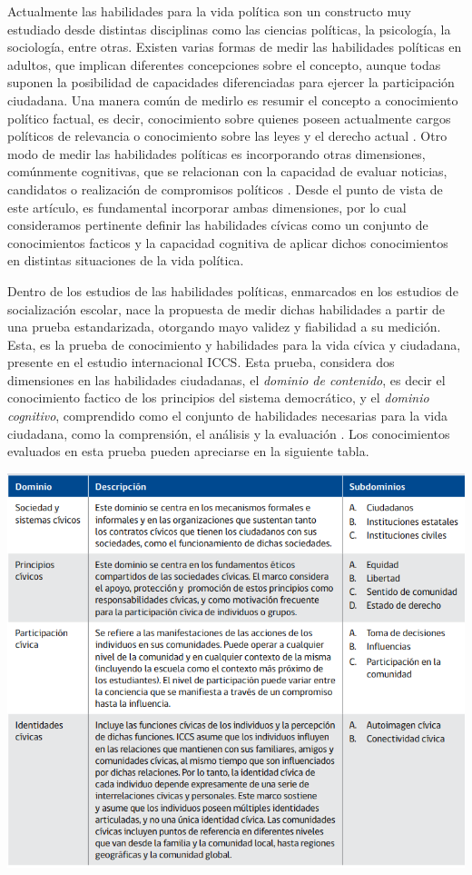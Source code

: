 \documentclass[12pt,twoside]{templates/facsothesis}
\begin{document}
Actualmente las habilidades para la vida política son un constructo muy estudiado desde distintas disciplinas como las ciencias políticas, la psicología, la sociología, entre otras. Existen varias formas de medir las habilidades políticas en adultos, que implican diferentes concepciones sobre el concepto, aunque todas suponen la posibilidad de capacidades diferenciadas para ejercer la participación ciudadana. Una manera común de medirlo es resumir el concepto a conocimiento político factual, es decir, conocimiento sobre quienes poseen actualmente cargos políticos de relevancia o conocimiento sobre las leyes y el derecho actual \citep{petricevic_Why_2020, vanerkel_Why_2020}. Otro modo de medir las habilidades políticas es incorporando otras dimensiones, comúnmente cognitivas, que se relacionan con la capacidad de evaluar noticias, candidatos o realización de compromisos políticos \citep{mondak_Citizen_2020, duval_Citizens_2018}. Desde el punto de vista de este artículo, es fundamental incorporar ambas dimensiones, por lo cual consideramos pertinente definir las habilidades cívicas como un conjunto de conocimientos facticos y la capacidad cognitiva de aplicar dichos conocimientos en distintas situaciones de la vida política.

Dentro de los estudios de las habilidades políticas, enmarcados en los estudios de socialización escolar, nace la propuesta de medir dichas habilidades a partir de una prueba estandarizada, otorgando mayo validez y fiabilidad a su medición. Esta, es la prueba de conocimiento y habilidades para la vida cívica y ciudadana, presente en el estudio internacional ICCS. Esta prueba, considera dos dimensiones en las habilidades ciudadanas, el \emph{dominio de contenido}, es decir el conocimiento factico de los principios del sistema democrático, y el \emph{dominio cognitivo}, comprendido como el conjunto de habilidades necesarias para la vida ciudadana, como la comprensión, el análisis y la evaluación \citep{schulz_Estudio_2011}. Los conocimientos evaluados en esta prueba pueden apreciarse en la siguiente tabla.

\begin{center}\includegraphics[width=0.8\linewidth,]{images/Contenidos} \end{center}
\end{document}

